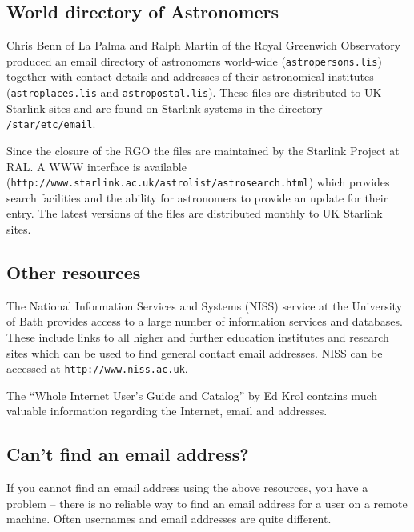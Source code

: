 \documentclass[twoside,11pt]{article}
\newcommand{\htmladdnormallink}[2]{#1}
\newcommand{\latex}[1]{#1}
\newcommand{\xlabel}[1]{}
\renewcommand{\_}{\texttt{\symbol{95}}}
\begin{document}
\subsection{\xlabel{world_directory_of_astronomers}World directory of
Astronomers} \label{world_directory_of_astronomers}

Chris Benn of La Palma and Ralph Martin of the Royal Greenwich
Observatory produced an email directory of astronomers world-wide
(\texttt{astropersons.lis}) together with contact details and addresses
of their astronomical institutes (\texttt{astroplaces.lis} and
\texttt{astropostal.lis}).  These files are distributed to UK Starlink 
sites and are found on Starlink systems in the
directory \texttt{/star/etc/email}.

Since the closure of the RGO the files are maintained by the
Starlink Project at RAL.  A \htmladdnormallink{WWW interface is
available}{http://www.starlink.ac.uk/astrolist/astrosearch.html}
\latex{(\texttt{http://www.starlink.ac.uk/astrolist/astrosearch.html})}
which provides search facilities and the ability for astronomers to
provide an update for their entry.  The latest versions of the files are
distributed monthly to UK Starlink sites.

\subsection{\xlabel{other_resources}Other resources}
\label{other_resources}

The National Information Services and Systems (NISS) service at the 
University of Bath provides access to a large number of information 
services and databases.  These include links to all higher and further
education institutes and research sites which can be used to find general
contact email addresses.  NISS can be accessed at
\htmladdnormallink{\texttt{http://www.niss.ac.uk}}{http://www.niss.ac.uk}.

The ``Whole Internet User's Guide and Catalog'' by Ed Krol contains
much valuable information regarding the Internet, email and addresses.

\subsection{\xlabel{cant_find_an_email_address}Can't find an email address?}
\label{cant_find_an_email_address}

If you cannot find an email address using the above resources, you have a 
problem -- there is no reliable way to find an email address for a user
on a remote machine.  Often usernames and email addresses are quite different.
\end{document}
